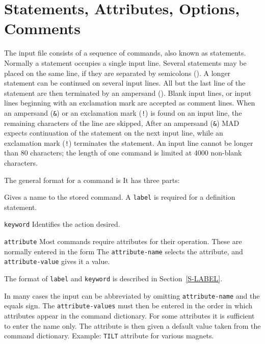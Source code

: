 \section{Statements, Attributes, Options, Comments}
\label{S-STATMT}
The input file consists of a sequence of commands,
also known as statements.
Normally a statement occupies a single input line.
Several statements may be placed on the same line,
if they are separated by semicolons (\ttindex{;}).
A longer statement can be continued on several input lines.
All but the last line of the statement are then terminated
by an ampersand (\ttindex{\&}).
Blank input lines,
or input lines beginning with an exclamation mark are accepted
as comment lines.
When an ampersand ({\tt\&}) or an exclamation mark
({\tt !}) is found
on an input line,
the remaining characters of the line are skipped,
After an ampersand ({\tt\&}) MAD expects continuation of the statement
on the next input line,
while an exclamation mark ({\tt!}) terminates the statement.
An input line cannot be longer than 80 characters;
the length of one command is limited at 4000 non-blank characters.
\par The general format for a command is
It has three parts:

\begin{mylist}
Gives a name to the stored command.
A {\tt label} is required for a definition statement.

\item[\tt keyword]
Identifies the action desired.

\item[\tt attribute]
Most commands require attributes for their operation.
These are normally entered in the form
The {\tt attribute-name} selects the attribute,
and {\tt attribute-value} gives it a value.
\end{mylist}

The format of {\tt label} and {\tt keyword}
is described in Section~\ref{S-LABEL}.
 
In many cases the input can be abbreviated by omitting
{\tt attribute-name} and the equals sign.
The {\tt attribute-values} must then be entered in the order
in which attributes appear in the command dictionary.
For some attributes it is sufficient to enter the name only.
The attribute is then given a default value taken from the
command dictionary.
Example: {\tt TILT} attribute for various magnets.
 
